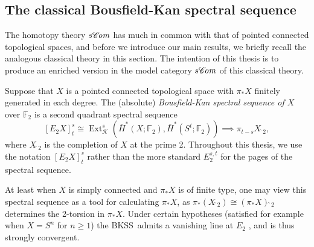 \documentclass[11pt]{amsart} \renewcommand{\baselinestretch}{1.2}
\theoremstyle{plain}
\numberwithin{equation}{section} %
\theoremstyle{plain}
\numberwithin{equation}{chapter} %
\DeclareMathOperator{\Ext}{Ext}
\newcommand{\scrC}{\mathscr{C}}
\newcommand{\calk}{\mathcal{K}}
\newcommand{\F}{\mathbb{F}}
\newcommand{\algs}{{\scrC\!\textit{\normalfont\textit{om}}}}
\newcommand{\Ftwo}{\F_2}
\newcommand{\E}[5]{[E^{#1}_{#2}#3]^{#4}_{#5}}
\newcommand{\BKSS}{BKSS}
\newcommand{\SubsectionOrSection}[1]{\subsection{#1}}
\begin{document}
\begin{Introduction}
\SubsectionOrSection{The classical Bousfield-Kan spectral sequence}
\label{Classicalstuff}


The homotopy theory $s\algs$ has much in common with that of pointed connected topological spaces, and before we introduce our main results, we briefly recall the analogous classical theory in this section. 
The intention of this thesis is to produce an enriched version in the model category $s\algs$ of this classical theory. 

Suppose that $X$ is a pointed connected topological space with $\pi_*X$ finitely generated in each degree. 
The (absolute) \emph{Bousfield-Kan spectral sequence of $X$} over $\Ftwo$ is a second quadrant spectral sequence
\[\E{}{2}{X}{s}{t}\cong \Ext^s_{\calk}(\overline{H}^*(X;\Ftwo),\overline{H}^*(S^t;\Ftwo))\implies \pi_{t-s}X\hat{\ }_{\!\!\!2},\]
where $X\hat{\ }_{\!\!\!2}$ is the completion of $X$ at the prime 2. Throughout this thesis, we use the notation $\E{}{2}{X}{s}{t}$ rather than the more standard $E_{2}^{s,t}$ for the pages of the spectral sequence.


At least when $X$ is simply connected and $\pi_*X$ is of finite type, one may view this spectral sequence as  a tool for calculating $\pi_*X$, as
$\pi_*(X\hat{\ }_{\!\!\!2})\cong (\pi_*X)\hat{\ }_{\!\!\!2}$
determines the 2-torsion in $\pi_*X$. Under certain hypotheses (satisfied for example when $X=S^n$ for $n\geq1$) the \BKSS\ admits a vanishing line at $E_2$  \cite{MR0266212}, and is thus strongly convergent.


\end{Introduction}
\end{document}
